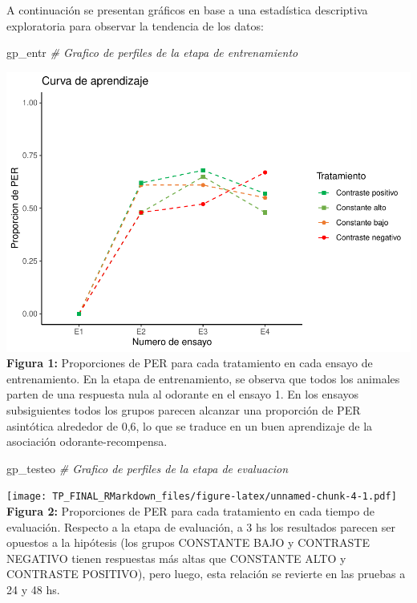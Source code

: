 \documentclass[]{article}
\newenvironment{Shaded}{\begin{snugshade}}{\end{snugshade}}
\newcommand{\CommentTok}[1]{\textcolor[rgb]{0.56,0.35,0.01}{\textit{#1}}}
\newcommand{\NormalTok}[1]{#1}
\begin{document}
A continuación se presentan gráficos en base a una estadística
descriptiva exploratoria para observar la tendencia de los datos:

\begin{Shaded}
\begin{Highlighting}[]
\NormalTok{gp_entr   }\CommentTok{# Grafico de perfiles de la etapa de entrenamiento}
\end{Highlighting}
\end{Shaded}

\includegraphics{TP_FINAL_RMarkdown_files/figure-latex/unnamed-chunk-3-1.pdf}
\textbf{Figura 1:} Proporciones de PER para cada tratamiento en cada
ensayo de entrenamiento. En la etapa de entrenamiento, se observa que
todos los animales parten de una respuesta nula al odorante en el ensayo
1. En los ensayos subsiguientes todos los grupos parecen alcanzar una
proporción de PER asintótica alrededor de 0,6, lo que se traduce en un
buen aprendizaje de la asociación odorante-recompensa.

\begin{Shaded}
\begin{Highlighting}[]
\NormalTok{gp_testeo }\CommentTok{# Grafico de perfiles de la etapa de evaluacion}
\end{Highlighting}
\end{Shaded}

\texttt{[image: TP\_FINAL\_RMarkdown\_files/figure-latex/unnamed-chunk-4-1.pdf]}
\textbf{Figura 2:} Proporciones de PER para cada tratamiento en cada
tiempo de evaluación. Respecto a la etapa de evaluación, a 3 hs los
resultados parecen ser opuestos a la hipótesis (los grupos CONSTANTE
BAJO y CONTRASTE NEGATIVO tienen respuestas más altas que CONSTANTE ALTO
y CONTRASTE POSITIVO), pero luego, esta relación se revierte en las
pruebas a 24 y 48 hs.
\end{document}
